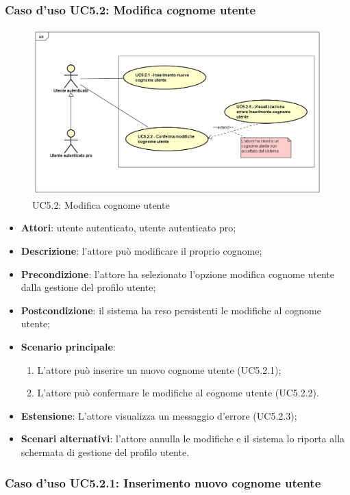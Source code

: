 \subsubsection{Caso d'uso UC5.2: Modifica cognome utente}
\label{UC5.2}
\begin{figure}[h]
	\centering
	\includegraphics[scale=0.5,keepaspectratio]{UML/UC5_2.png}
	\caption{UC5.2: Modifica cognome utente}
\end{figure}
\begin{itemize}
	\item \textbf{Attori}: utente autenticato, utente autenticato pro;
	\item \textbf{Descrizione}: l'attore può modificare il proprio cognome;
	\item \textbf{Precondizione}: l'attore ha selezionato l'opzione modifica cognome utente dalla gestione del profilo utente; 
	\item \textbf{Postcondizione}: il sistema ha reso persistenti le modifiche al cognome utente;
	\item \textbf{Scenario principale}:
	\begin{enumerate}
		\item L'attore può inserire un nuovo cognome utente (UC5.2.1);
		\item L'attore può confermare le modifiche al cognome utente (UC5.2.2).
	\end{enumerate}
	\item \textbf{Estensione}: L'attore visualizza un messaggio d'errore (UC5.2.3);
	\item \textbf{Scenari alternativi}: l'attore annulla le modifiche e il sistema lo riporta alla schermata di gestione del profilo utente.
\end{itemize}

\subsubsection{Caso d'uso UC5.2.1: Inserimento nuovo cognome utente}

